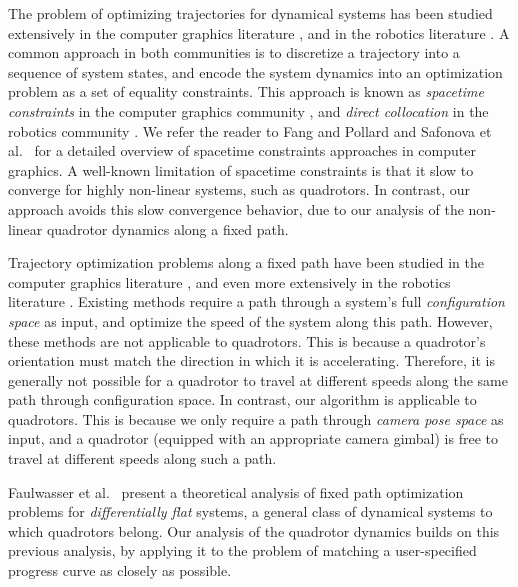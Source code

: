 The problem of optimizing trajectories for dynamical systems has been studied extensively in the computer  graphics literature \cite{geijtenbeek:2012}, and in the robotics literature \cite{betts:1998}.
A common approach in both communities is to discretize a trajectory into a sequence of system states, and encode the system dynamics into an optimization problem as a set of equality constraints.
This approach is known as \emph{spacetime constraints} in the computer graphics community \cite{witkins:1988}, and \emph{direct collocation} in the robotics community \cite{betts:1998}.
We refer the reader to Fang and Pollard  and Safonova et al.~ for a detailed overview of spacetime constraints approaches in computer graphics.
A well-known limitation of spacetime constraints is that it slow to converge for highly non-linear systems, such as quadrotors.
In contrast, our approach avoids this slow convergence behavior, due to our analysis of the non-linear quadrotor dynamics along a fixed path.

Trajectory optimization problems along a fixed path have been studied in the computer graphics literature \cite{mccann:2006}, and even more extensively in the robotics literature \cite{dahl:1990,lipp:2014,shin:1985,slotine:1989,verscheure:2009}.
Existing methods require a path through a system's full \emph{configuration space} as input, and optimize the speed of the system along this path.
However, these methods are not applicable to quadrotors.
This is because a quadrotor's orientation must match the direction in which it is accelerating.
Therefore, it is generally not possible for a quadrotor to travel at different speeds along the same path through configuration space.
In contrast, our algorithm is applicable to quadrotors.
This is because we only require a path through \emph{camera pose space} as input, and a quadrotor (equipped with an appropriate camera gimbal) is free to travel at different speeds along such a path.

Faulwasser et al.~ present a theoretical analysis of fixed path optimization problems for \emph{differentially flat} systems, a general class of dynamical systems to which quadrotors belong.
Our analysis of the quadrotor dynamics builds on this previous analysis, by applying it to the problem of matching a user-specified progress curve as closely as possible.       
